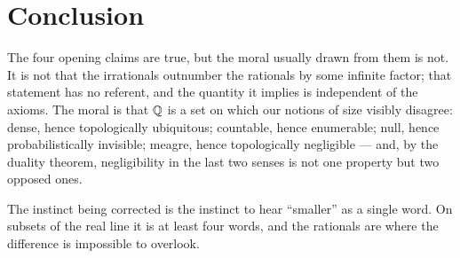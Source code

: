 \documentclass{essay}
\begin{document}
\section{Conclusion}

The four opening claims are true, but the moral usually drawn from them
is not. It is not that the irrationals outnumber the rationals by some
infinite factor; that statement has no referent, and the quantity it
implies is independent of the axioms. The moral is that \(\mathbb{Q}\) is a set
on which our notions of size visibly disagree: dense, hence
topologically ubiquitous; countable, hence enumerable; null, hence
probabilistically invisible; meagre, hence topologically negligible ---
and, by the duality theorem, negligibility in the last two senses is
not one property but two opposed ones.

The instinct being corrected is the instinct to hear ``smaller'' as a
single word. On subsets of the real line it is at least four words, and
the rationals are where the difference is impossible to overlook.
\end{document}
